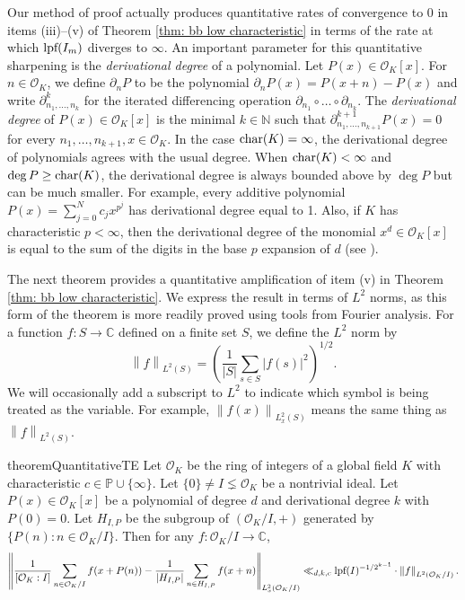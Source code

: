 \documentclass{amsart}
\theoremstyle{definition}
\numberwithin{equation}{section}
\newcommand{\N}{\mathbb{N}}
\newcommand{\C}{\mathbb{C}}
\newcommand{\mO}{\mathcal{O}}
\newcommand{\lpf}{\normalfont\text{lpf}}
\newcommand{\norm}[2]{\left\| #2 \right\|_{#1}}
\begin{document}
Our method of proof actually produces quantitative rates of convergence to $0$ in items (iii)--(v) of Theorem \ref{thm: bb low characteristic} in terms of the rate at which $\lpf(I_m)$ diverges to $\infty$.
An important parameter for this quantitative sharpening is the \emph{derivational degree} of a polynomial.
Let $P(x) \in \mO_K[x]$.
For $n \in \mO_K$, we define $\partial_n P$ to be the polynomial $\partial_nP(x) = P(x+n) - P(x)$ and write $\partial^k_{n_1, \dots, n_k}$ for the iterated differencing operation $\partial_{n_1} \circ \dots \circ \partial_{n_k}$.
The \emph{derivational degree} of $P(x) \in \mO_K[x]$ is the minimal $k \in \N$ such that $\partial^{k+1}_{n_1, \dots, n_{k+1}}P(x) = 0$ for every $n_1, \dots, n_{k+1}, x \in \mO_K$.
In the case $\textup{char}(K) = \infty$, the derivational degree of polynomials agrees with the usual degree.
When $\textup{char}(K) < \infty$ and $\deg{P} \ge \textup{char}(K)$, the derivational degree is always bounded above by $\deg{P}$ but can be much smaller.
For example, every additive polynomial $P(x) = \sum_{j=0}^N c_j x^{p^j}$ has derivational degree equal to 1.
Also, if $K$ has characteristic $p < \infty$, then the derivational degree of the monomial $x^d \in \mO_K[x]$ is equal to the sum of the digits in the base $p$ expansion of $d$ (see \cite[1.7]{blm}).

The next theorem provides a quantitative amplification of item (v) in Theorem \ref{thm: bb low characteristic}.
We express the result in terms of $L^2$ norms, as this form of the theorem is more readily proved using tools from Fourier analysis.
For a function $f : S \to \C$ defined on a finite set $S$, we define the $L^2$ norm by
\begin{equation*}
    \norm{L^2(S)}{f} = \left( \frac{1}{|S|} \sum_{s \in S} |f(s)|^2 \right)^{1/2}.
\end{equation*}
We will occasionally add a subscript to $L^2$ to indicate which symbol is being treated as the variable.
For example, $\norm{L^2_x(S)}{f(x)}$ means the same thing as $\norm{L^2(S)}{f}$.

\begin{restatable}{theorem}{QuantitativeTE} \label{thm: quantitative TE}
	Let $\mO_K$ be the ring of integers of a global field $K$ with characteristic $c \in \mathbb{P} \cup \{\infty\}$.
	Let $\{0\} \ne I \lneq \mO_K$ be a nontrivial ideal.
	Let $P(x) \in \mO_K[x]$ be a polynomial of degree $d$ and derivational degree $k$ with $P(0) = 0$.
    Let $H_{I,P}$ be the subgroup of $(\mO_K/I,+)$ generated by $\{P(n) : n \in \mO_K/I\}$.
    Then for any $f : \mO_K/I \to \C$,
    \begin{equation} \label{eq: L^2 estimate}
		\norm{L^2_x(\mO_K/I)}{\frac{1}{[\mO_K:I]}\sum_{n \in \mO_K/I} f(x+P(n)) - \frac{1}{|H_{I,P}|} \sum_{n \in H_{I,P}} f(x+n)} \ll_{d,k,c} \lpf(I)^{-1/2^{k-1}} \cdot \norm{L^2(\mO_K/I)}{f}.
	\end{equation}
\end{restatable}
\end{document}
